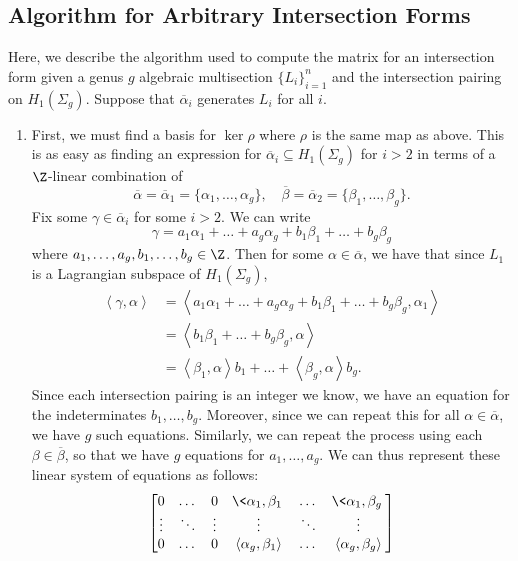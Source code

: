 \subsection{Algorithm for Arbitrary Intersection Forms}

Here, we describe the algorithm used to compute the matrix for an intersection form given a genus $g$ algebraic multisection $\{L_i\}_{i = 1}^n$ and the intersection pairing on $H_1(\Sigma_g)$. Suppose that $\overline{\alpha}_i$ generates $L_i$ for all $i$. 
\begin{enumerate}
	\item First, we must find a basis for $\ker\rho$ where $\rho$ is the same map as above. This is as easy as finding an expression for $\overline{\alpha}_i \subseteq H_1(\Sigma_g)$ for $i > 2$ in terms of a $\Z$-linear combination of \[\overline{\alpha} = \overline{\alpha}_1 = \{\alpha_1,\dots,\alpha_g\}, \quad \overline{\beta} = \overline{\alpha}_2 = \{\beta_1,\dots,\beta_g\}.\] Fix some $\gamma \in \overline{\alpha}_i$ for some $i > 2$. We can write \[\gamma = a_1\alpha_1 + \dots + a_g\alpha_g + b_1\beta_1 + \dots + b_g\beta_g\] where $a_1,\dots,a_g,b_1,\dots,b_g \in \Z$. Then for some $\alpha \in \overline{\alpha}$, we have that since $L_1$ is a Lagrangian subspace of $H_1(\Sigma_g)$,
	\begin{align*}
		\left< \gamma, \alpha \right> &= \left< a_1\alpha_1 + \dots + a_g\alpha_g + b_1\beta_1 + \dots + b_g\beta_g, \alpha_1 \right>\\
									  &= \left< b_1\beta_1 + \dots + b_g\beta_g, \alpha \right>\\
									  &= \left< \beta_1, \alpha \right>b_1 + \dots + \left< \beta_g, \alpha \right>b_g.
	\end{align*}
	Since each intersection pairing is an integer we know, we have an equation for the indeterminates $b_1,\dots,b_g$. Moreover, since we can repeat this for all $\alpha \in \overline{\alpha}$, we have $g$ such equations. Similarly, we can repeat the process using each $\beta \in \overline{\beta}$, so that we have $g$ equations for $a_1,\dots,a_g$. We can thus represent these linear system of equations as follows:
	\begin{align*}
		\begin{bmatrix}
			0 & \dots & 0 & \<\alpha_1, \beta_1\> & \dots & \<\alpha_1, \beta_g\>\\
			\vdots & \ddots & \vdots & \vdots & \ddots & \vdots\\
			0 & \dots & 0 & \left< \alpha_g, \beta_1 \right> & \dots & \left< \alpha_g, \beta_g \right>\\

\end{bmatrix}
\end{align*}
\end{enumerate}
